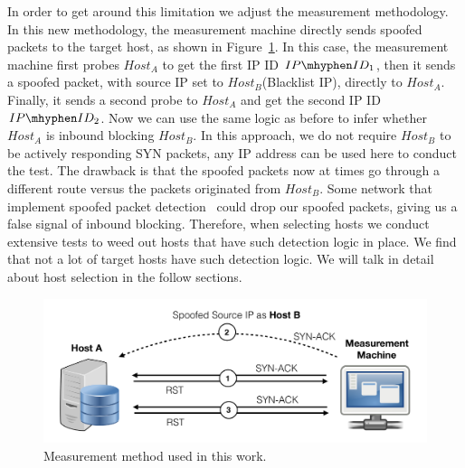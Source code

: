 In order to get around this limitation we adjust the measurement methodology.
In this new methodology, the measurement machine directly sends spoofed
packets to the target host, as shown in Figure~\ref{fig:new_method}. In
this case, the measurement machine first probes $Host_A$ to get the first IP ID
$IP\mhyphen ID_1$, then it sends a spoofed packet, with source IP set to
$Host_B$(Blacklist IP), directly to $Host_A$. Finally, it sends a second probe
to $Host_A$ and get the second IP ID $IP\mhyphen ID_2$. Now we can use the same
logic as before to infer whether $Host_A$ is inbound blocking $Host_B$. In this
approach, we do not require $Host_B$ to be actively responding SYN packets, any
IP address can be used here to conduct the test. The drawback is that the
spoofed packets now at times go through a different route versus the packets
originated from $Host_B$. Some network that implement spoofed packet
detection~\cite{ferguson2000rfc2827} could drop our spoofed packets, giving us
a false signal of inbound blocking. Therefore, when selecting hosts we conduct
extensive tests to weed out hosts that have such detection logic in place. We
find that not a lot of target hosts have such detection logic. We will talk in
detail about host selection in the follow sections.


\begin{figure}[t]
\centering
\includegraphics[width=0.8\columnwidth]{data_usage/images/croped_method_new.pdf}
\caption{Measurement method used in this work.}
\label{fig:new_method}
\end{figure}